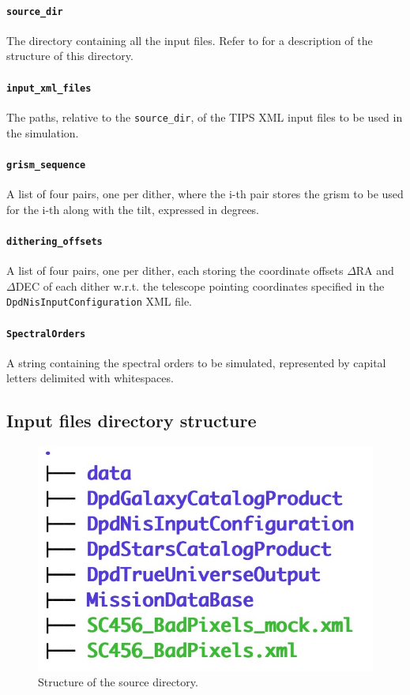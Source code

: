 \paragraph{\texttt{source\_dir}} The directory containing all the input files. Refer to  for a description of the structure of this directory.

\paragraph{\texttt{input\_xml\_files}} The paths, relative to the \verb+source_dir+, of the TIPS XML input files to be used in the simulation.

\paragraph{\texttt{grism\_sequence}} A list of four pairs, one per dither, where the i-th pair stores the grism to be used for the i-th along with the tilt, expressed in degrees.

\paragraph{\texttt{dithering\_offsets}} A list of four pairs, one per dither, each storing the coordinate offsets $\Delta$RA and $\Delta$DEC of each dither w.r.t. the telescope pointing coordinates specified in the \verb+DpdNisInputConfiguration+ XML file. 

\paragraph{\texttt{SpectralOrders}} A string containing the spectral orders to be simulated, represented by capital letters delimited with whitespaces.

\subsection{Input files directory structure}\label{subsec:source_directory}

\begin{figure}
    \centering
    \includegraphics[scale=0.2]{figures/source_dir_structure.jpg}
    \caption{Structure of the source directory.}
    \label{fig:source_dir_structure}
\end{figure}

